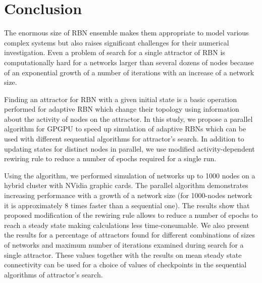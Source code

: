 \documentclass[procedia]{easychair}
\begin{document}
	\section{Conclusion}
	The enormous size of RBN ensemble makes them appropriate to model various complex systems but also raises significant challenges for their numerical investigation. Even a problem of search for a single attractor of RBN is computationally hard for a networks larger than several dozens of nodes because of an exponential growth of a number of iterations with an increase of a network size.
	
	Finding an attractor for RBN with a given initial state is a basic operation performed for adaptive RBN which change their topology using information about the activity of nodes on the attractor. In this study, we propose a parallel algorithm for GPGPU to speed up simulation of adaptive RBNs which can be used with different sequential algorithms for attractor's search. In addition to updating states for distinct nodes in parallel, we use modified activity-dependent rewiring rule to reduce a number of epochs required for a single run.
	
	Using the algorithm, we performed simulation of networks up to 1000 nodes on a hybrid cluster with NVidia graphic cards. The parallel algorithm demonstrates increasing performance with a growth of a network size (for 1000-nodes network it is approximately 8 times faster than a sequential one). The results show that proposed modification of the rewiring rule allows to reduce a number of epochs to reach a steady state making calculations less time-consumable. We also present the results for a percentage of attractors found for different combinations of sizes of networks and maximum number of iterations examined during search for a single attractor. These values together with the results on mean steady state connectivity can be used for a choice of values of checkpoints in the sequential algorithms of attractor's search.   
	
	\label{sect:conclusion}
	
	\label{sect:bib}
	
	
\end{document}
